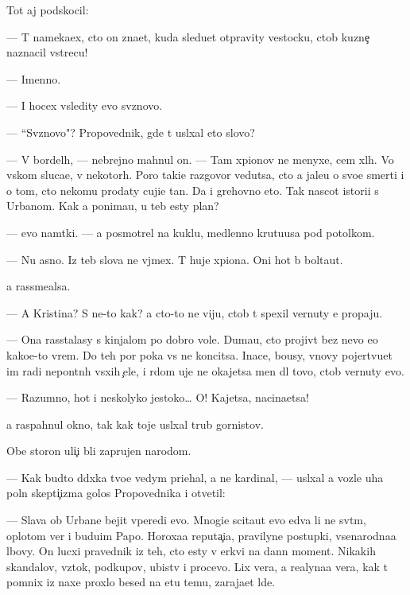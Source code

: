 \documentclass[10pt]{book}
\begin{document}
Tot aj podskocil:

— T{\yi} nameka{\y}ex, cto on zna{\y}et, kuda sledu{\y}et otpravity vestocku, ctob{\yi} kuzne{\c} naznacil vstrecu!

— Imenno.

— I hocex v{\yi}sledity {\y}evo sv{\ia}znovo.

— ``Sv{\ia}znovo"? Propovednik, gde t{\yi} usl{\yi}xal eto slovo?

— V bordel{\ia}h, — nebrejno mahnul on. — Tam xpionov ne menyxe, cem xl{\iu}h. Vo vs{\ia}kom sluca{\y}e, v nekotor{\yi}h. Poro{\y} taki{\y}e razgovor{\yi} vedutsa, cto {\y}a jale{\y}u o svo{\y}e{\y} smerti i o tom, cto nekomu prodaty cuji{\y}e ta{\y}n{\yi}. Da i grehovno eto. Tak nascot istori{\y}i s Urbanom. Kak {\y}a ponima{\y}u, u teb{\ia} {\y}esty plan?

— {\Y}evo nam{\e}tki. — {\Y}a posmotrel na kuklu, medlenno krut{\ia}{\x}u{\y}usa pod potolkom.

— Nu {\y}asno. Iz teb{\ia} slova ne v{\yi}jmex. T{\yi} huje xpiona. Oni hot{\ia} b{\yi} bolta{\y}ut.

{\Y}a rassme{\y}alsa.

— A Kristina? S ne{\y}-to kak? {\Y}a cto-to ne viju, ctob{\yi} t{\yi} spexil vernuty {\y}e{\y} propaju.

— Ona rasstalasy s kinjalom po dobro{\y} vole. Duma{\y}u, cto projiv{\e}t bez nevo {\y}e{\x}o kako{\y}e-to vrem{\ia}. Do teh por poka vs{\e} ne koncitsa. Inace, bo{\y}usy, vnovy pojertvu{\y}et im radi nepon{\ia}tn{\yi}h v{\yi}sxih {\c}ele{\y}, i r{\ia}dom uje ne okajetsa men{\ia} dl{\ia} tovo, ctob{\yi} vernuty {\y}evo.

— Razumno, hot{\ia} i neskolyko jestoko… O! Kajetsa, nacina{\y}etsa!

{\Y}a raspahnul okno, tak kak toje usl{\yi}xal trub{\yi} gornistov.

Obe storon{\yi} uli{\c}i b{\yi}li zaprujen{\yi} narodom.

— Kak budto d{\ia}d{\iu}xka tvo{\y}e{\y} vedym{\yi} pri{\y}ehal, a ne kardinal, — usl{\yi}xal {\y}a vozle uha poln{\yi}{\y} skepti{\c}izma golos Propovednika i otvetil:

— Slava ob Urbane bejit vperedi {\y}evo. Mnogi{\y}e scita{\y}ut {\y}evo {\y}edva li ne sv{\ia}t{\yi}m, oplotom ver{\yi} i budu{\x}im Papo{\y}. Horoxa{\y}a reputa{\c}i{\y}a, pravilyn{\yi}{\y}e postupki, vsenarodna{\y}a l{\iu}bovy. On lucxi{\y} pravednik iz teh, cto {\y}esty v {\C}erkvi na dann{\yi}{\y} moment. Nikakih skandalov, vz{\ia}tok, podkupov, ubi{\y}stv i procevo. Lix vera, a realyna{\y}a vera, kak t{\yi} pomnix iz naxe{\y} proxlo{\y} besed{\yi} na etu temu, zaraja{\y}et l{\iu}de{\y}.
\end{document}
